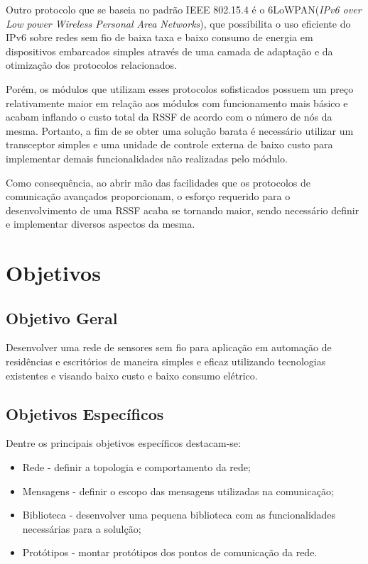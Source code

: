\documentclass[
    12pt,               %
    a4paper,            %
    english,            %
    brazil,             %
    ]{article}
\begin{document}
Outro protocolo que se baseia no padrão IEEE 802.15.4 é o 6LoWPAN(\textit{IPv6 over Low power Wireless Personal Area Networks}),
que possibilita o uso eficiente do IPv6 sobre redes sem fio de baixa taxa e baixo consumo de energia em dispositivos embarcados
simples através de uma camada de adaptação e da otimização dos protocolos relacionados. \cite{shelby_bormann2009}

Porém, os módulos que utilizam esses protocolos sofisticados possuem um preço relativamente maior em relação aos módulos com
funcionamento mais básico e acabam inflando o custo total da RSSF de acordo com o número de nós da mesma. Portanto, a fim de se
obter uma solução barata é necessário utilizar um transceptor simples e uma unidade de controle externa de baixo custo para
implementar demais funcionalidades não realizadas pelo módulo.

Como consequência, ao abrir mão das facilidades que os protocolos de comunicação avançados proporcionam, o esforço requerido para
o desenvolvimento de uma RSSF acaba se tornando maior, sendo necessário definir e implementar diversos aspectos da mesma.

\section{Objetivos}


	\subsection{Objetivo Geral}

	Desenvolver uma rede de sensores sem fio para aplicação em automação de residências e escritórios de maneira simples e eficaz
	utilizando tecnologias existentes e visando baixo custo e baixo consumo elétrico.

	\subsection{Objetivos Específicos}

	Dentre os principais objetivos específicos destacam-se:
	\begin{itemize}
		\item Rede - definir a topologia e comportamento da rede;
		\item Mensagens - definir o escopo das mensagens utilizadas na comunicação;
		\item Biblioteca - desenvolver uma pequena biblioteca com as funcionalidades necessárias para a solulção;
		\item Protótipos - montar protótipos dos pontos de comunicação da rede.
	\end{itemize}
\end{document}
